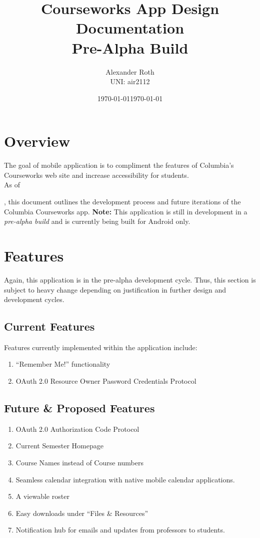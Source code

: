 \documentclass{article}
\title{Courseworks App Design Documentation \\ Pre-Alpha Build}
\author{Alexander Roth \\ UNI: air2112}
\date{\today}
\begin{document}
\maketitle

\section{Overview}
The goal of mobile application is to compliment the features of Columbia's Courseworks web site and increase accessibility for students. \\
\indent As of \date{\today}, this document outlines the development process and future iterations of the Columbia Courseworks app. 
\textbf{Note:} This application is still in development in a \emph{pre-alpha build} and is currently being built for Android only.

\section{Features}
Again, this application is in the pre-alpha development cycle. Thus, this section is subject to heavy change depending on justification in further design and development cycles.

\subsection{Current Features}
Features currently implemented within the application include:
\begin{enumerate}
\item ``Remember Me!'' functionality
\item OAuth 2.0 Resource Owner Password Credentials Protocol
\end{enumerate}

\subsection{Future \& Proposed Features}
\begin{enumerate}
\item OAuth 2.0 Authorization Code Protocol
\item Current Semester Homepage
\item Course Names instead of Course numbers
\item Seamless calendar integration with native mobile calendar applications.
\item A viewable roster
\item Easy downloads under ``Files \& Resources''
\item Notification hub for emails and updates from professors to students.
\end{enumerate}
\end{document}
